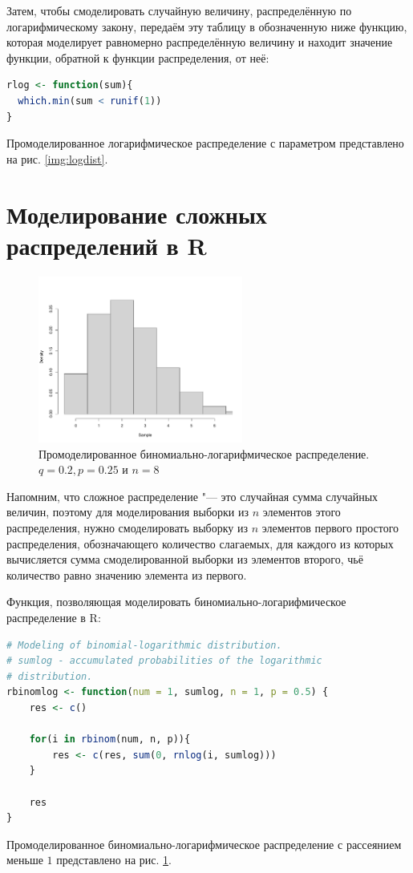 \documentclass[12pt, specialist, subf, substylefile = spbu_report.rtx]{disser}
\begin{document}
	Затем, чтобы смоделировать случайную величину, распределённую по логарифмическому закону, передаём эту таблицу в обозначенную ниже функцию, которая моделирует равномерно распределённую величину и находит значение функции, обратной к функции распределения, от неё:
	
	\begin{lstlisting}[language=R]
rlog <- function(sum){
  which.min(sum < runif(1))
}
	\end{lstlisting}	
	
	Промоделированное логарифмическое распределение с параметром представлено на рис. \ref{img:logdist}.
	
	\section{Моделирование сложных распределений в R}
	
	\begin{figure}[ht]
		\centering
		\includegraphics[width = 0.6\textwidth]{binlogsample}
		\caption{Промоделированное биномиально-логарифмическое распределение. $ q = 0.2, p = 0.25 $ и $ n = 8 $}
		\label{img:binlogsample}
	\end{figure}
	
	Напомним, что сложное распределение "--- это случайная сумма случайных величин, поэтому для моделирования выборки из $ n $ элементов этого распределения, нужно смоделировать выборку из $ n $ элементов первого простого распределения, обозначающего количество слагаемых, для каждого из которых вычисляется сумма смоделированной выборки из элементов второго, чьё количество равно значению элемента из первого.
	
	Функция, позволяющая моделировать биномиально-логарифмическое распределение в R:
	\begin{lstlisting}[language=R]
# Modeling of binomial-logarithmic distribution.
# sumlog - accumulated probabilities of the logarithmic
# distribution.
rbinomlog <- function(num = 1, sumlog, n = 1, p = 0.5) {
	res <- c()
	
	for(i in rbinom(num, n, p)){
		res <- c(res, sum(0, rnlog(i, sumlog)))
	}
	
	res
}
	\end{lstlisting}
	\label{page:Rmodel}
	Промоделированное биномиально-логарифмическое распределение с рассеянием меньше $ 1 $ представлено на рис. \ref{img:binlogsample}.
	
\end{document}
